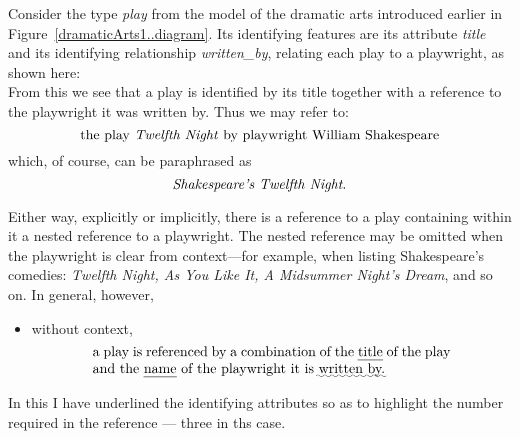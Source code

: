 Consider the type \textit{play} from the model of the dramatic arts introduced earlier in Figure~\ref{dramaticArts1..diagram}.
Its identifying features are its attribute \textit{title} and its identifying relationship \textit{written\_by}, relating each play to a playwright, as shown here:
\begin{equation*}

\end{equation*}
From this we see that a play is identified by its title together with a reference to the playwright it was written by.
Thus we may refer to:
\begin{equation}
\mbox{the play \textit{Twelfth Night} by playwright William Shakespeare}
\end{equation}
which, of course, can  be paraphrased as
\begin{equation}
\mbox{\textit{Shakespeare’s Twelfth Night}.}
\end{equation}

Either way, explicitly or implicitly, there is a reference to a play containing within it a nested reference to a playwright.
The nested reference may be omitted when the playwright is clear from context—for example, when listing Shakespeare’s comedies:
\textit{Twelfth Night, As You Like It, A Midsummer Night’s Dream}, and so on.
In general, however,
\begin{itemize}
\item without context,
\begin{equation}
\label{absolutePlayReferencing}
\text{\parbox{9cm}{
a play is referenced by a combination of the \uline{title} of the play and the \uline{name} of the playwright it is \uwave{written by.}
}}
\end{equation}
\end{itemize}
In this I have underlined the identifying attributes so as to highlight the number required in the reference --- three in ths case.



